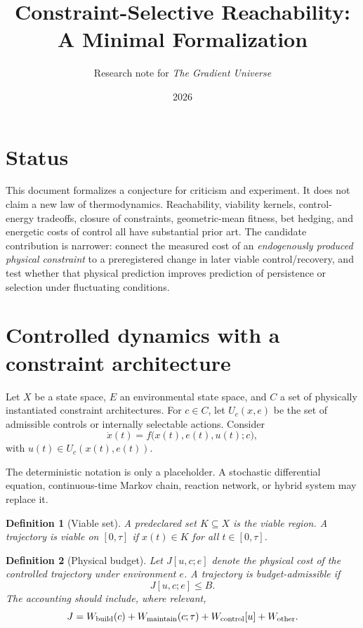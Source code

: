 \documentclass[11pt]{article}
\title{Constraint-Selective Reachability: A Minimal Formalization}
\author{Research note for \emph{The Gradient Universe}}
\date{2026}
\newtheorem{definition}{Definition}
\begin{document}
\maketitle

\section{Status}

This document formalizes a conjecture for criticism and experiment. It does not claim a new law of thermodynamics. Reachability, viability kernels, control-energy tradeoffs, closure of constraints, geometric-mean fitness, bet hedging, and energetic costs of control all have substantial prior art. The candidate contribution is narrower: connect the measured cost of an \emph{endogenously produced physical constraint} to a preregistered change in later viable control/recovery, and test whether that physical prediction improves prediction of persistence or selection under fluctuating conditions.

\section{Controlled dynamics with a constraint architecture}

Let $X$ be a state space, $E$ an environmental state space, and $C$ a set of physically instantiated constraint architectures. For $c\in C$, let $U_c(x,e)$ be the set of admissible controls or internally selectable actions. Consider
\begin{equation}
    \dot{x}(t)=f\bigl(x(t),e(t),u(t);c\bigr),
\end{equation}
with $u(t)\in U_c(x(t),e(t))$.

The deterministic notation is only a placeholder. A stochastic differential equation, continuous-time Markov chain, reaction network, or hybrid system may replace it.

\begin{definition}[Viable set]
A predeclared set $K\subseteq X$ is the viable region. A trajectory is viable on $[0,\tau]$ if $x(t)\in K$ for all $t\in[0,\tau]$.
\end{definition}

\begin{definition}[Physical budget]
Let $J[u,c;e]$ denote the physical cost of the controlled trajectory under environment $e$. A trajectory is budget-admissible if
\begin{equation}
    J[u,c;e]\le B.
\end{equation}
The accounting should include, where relevant,
\begin{equation}
    J=W_{\rm build}(c)+W_{\rm maintain}(c;\tau)+W_{\rm control}[u]+W_{\rm other}.
\end{equation}
\end{definition}
\end{document}

